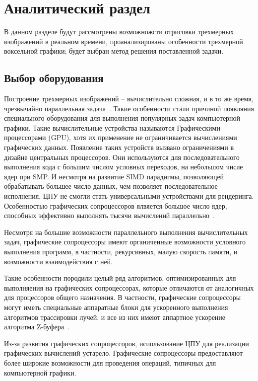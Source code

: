 \chapter{Аналитический раздел}

В данном разделе будут рассмотрены возможножсти отрисовки 
трехмерных изображений в реальном времени, проанализированы особенности трехмерной 
воксельной графики; будет выбран метод решения поставленной задачи.

\section{Выбор оборудования}

Построение трехмерных изображений -- вычислительно сложная, и в то же время, чрезвычайно 
параллельная задача~\cite{DaBPP}. Такие особенности стали причиной появляния специального оборудования 
для выполнения популярных задач компьютерной графики. Такие вычислительные устройства
называются Графическими процессорами (GPU), хотя их применение не ограничивается вычислениями
графических данных. Появление таких устройств вызвано ограничениями в дизайне центральных
процессоров. Они используются для последовательного выполнения кода с большим числом условных 
переходов, на небольшом числе ядер при SMP. И несмотря на 
развитие SIMD парадигмы, позволяющей обрабатывать большее число данных, чем позволяет
последовательное исполнения, ЦПУ не смогли стать универсальными устройствами для рендеринга.
Особенностью графических сопроцессоров ялвяется большое число ядер, способных эффективно 
выполнять тысячи вычислений параллельно~\cite{ACLaG}.

Несмотря на большие возможности параллельного выполнения вычислительных задач,
графические сопроцессоры имеют органиченные возможности условного выполнения программ, в 
частности, рекурсивных, малую скорость памяти, и возможности взаимодействия с ней.

Такие особенности породили целый ряд алгоритмов, оптимизированных для выполняения 
на графических
сопроцессорах, которые отличаются от аналогичных для процессоров общего назначения. 
В частности, 
графические сопроцессоры могут иметь специальные аппаратные блоки для ускоренного выполнения 
алгоритмов трассировки лучей, и все из них имеют аппартное ускорение алгоритма Z-буфера~\cite{RTiv}.

Из-за развития графических сопроцессоров, использование ЦПУ для реализации графических
вычислений устарело. Графические сопроцессоры предоставляют более широкие возможности 
для проведения операций, типичных для компьютерной графики. 


